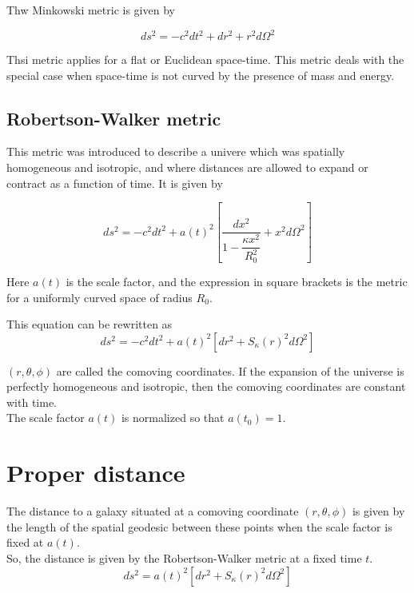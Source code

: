 \documentclass[a4,10pt,oneside]{report}
\begin{document}
	Thw Minkowski metric is given by
	
	\begin{equation}
		ds^2=-c^2dt^2+dr^2+r^2d\Omega^2
	\end{equation}
	
	Thsi metric applies for a flat or Euclidean space-time. This metric deals with the special case when space-time is not curved by the presence of mass and energy.
	
	\subsection{Robertson-Walker metric}
	
	This metric was introduced to describe a univere which was spatially homogeneous and isotropic, and where distances are allowed to expand or contract as a function of time. It is given by
	
	\begin{equation}
		ds^2=-c^2dt^2+a(t)^2\left[\frac{dx^2}{1-\dfrac{\kappa x^2}{R_0^2}} +x^2d\Omega^2\right]
	\end{equation}
	
	Here $a(t)$ is the scale factor, and the expression in square brackets is the metric for a uniformly curved space of radius $R_0$.

	This equation can be rewritten as 
	\begin{equation}
		ds^2=-c^2dt^2+a(t)^2[dr^2+S_\kappa(r)^2d\Omega^2]
	\end{equation}
	
	$ (r,\theta, \phi) $ are called the comoving coordinates. If the expansion of the universe is perfectly homogeneous and isotropic, then the comoving coordinates are constant with time. \\
	
	The scale factor $ a(t) $ is normalized so that $ a(t_0) =1$.
	
	\section{Proper distance}
	The distance to a galaxy situated at a comoving coordinate $ (r,\theta,\phi) $ is given by the length of the spatial geodesic between these points when the scale factor is fixed at $ a(t) $. \\
	
	So, the distance is given by the Robertson-Walker metric at a fixed time $ t $.
	\begin{equation}
		ds^2=a(t)^2[dr^2+S_\kappa(r)^2d\Omega^2]
	\end{equation}
	
\end{document}
